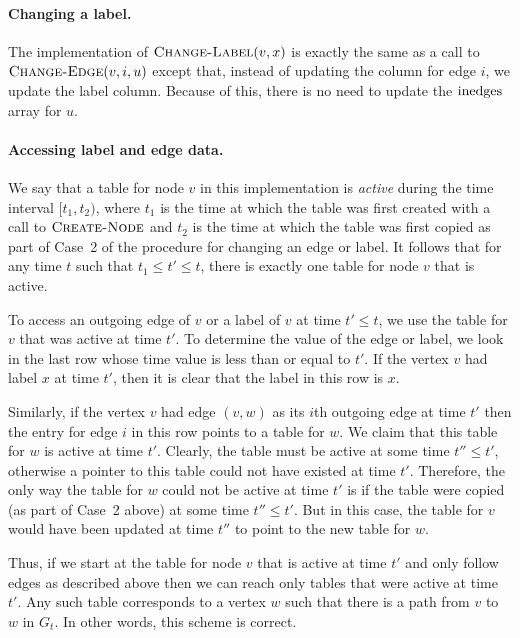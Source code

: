 \paragraph{Changing a label.}

The implementation of $\textsc{Change-Label}(v,x)$ is exactly the same
as a call to $\textsc{Change-Edge}(v,i,u)$ except that, instead of updating
the column for edge $i$, we update the label column.  Because of this,
there is no need to update the $\mathrm{inedges}$ array for $u$.

\paragraph{Accessing label and edge data.}

We say that a table for node $v$ in this implementation is
\emph{active} during the time interval $[t_1,t_2)$, where $t_1$ is
the time at which the table was first created with a call to
$\textsc{Create-Node}$ and $t_2$ is the time at which the table was
first copied as part of Case~2 of the procedure for changing an edge
or label.  It follows that for any time $t$ such that $t_1\le t'\le
t$, there is exactly one table for node $v$ that is active.

To access an outgoing edge of $v$ or a label of $v$ at time $t'\le t$,
we use the table for $v$ that was active at time $t'$. To determine
the value of the edge or label, we look in the last row whose time
value is less than or equal to $t'$.  If the vertex $v$ had label $x$
at time $t'$, then it is clear that the label in this row is $x$.

Similarly, if the vertex $v$ had edge $(v,w)$ as its $i$th outgoing
edge at time $t'$ then the entry for edge $i$ in this row points to a
table for $w$.  We claim that this table for $w$ is active at time
$t'$.  Clearly, the table must be active at some time $t''\le t'$,
otherwise a pointer to this table could not have existed at time $t'$.
Therefore, the only way the table for $w$ could not be active at time
$t'$ is if the table were copied (as part of Case~2 above) at some
time $t''\le t'$.  But in this case, the table for $v$ would have been
updated at time $t''$ to point to the new table for $w$.

Thus, if we start at the table for node $v$ that is active at time
$t'$ and only follow edges as described above then we can reach only
tables that were active at time $t'$. Any such table corresponds to a
vertex $w$ such that there is a path from $v$ to $w$ in $G_t$.  In
other words, this scheme is correct.

